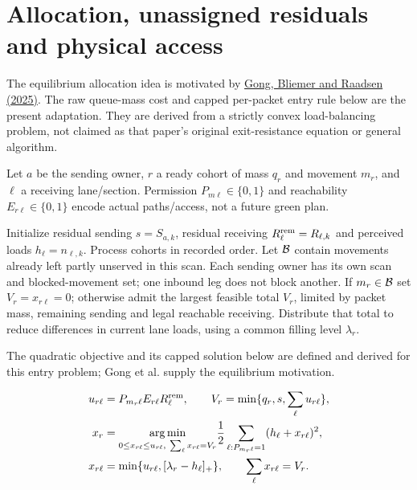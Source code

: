 \documentclass[10pt,a4paper]{article}
\newcommand{\pos}[1]{[#1]_+}
\newcommand{\rev}[1]{{\color{revisionred}#1}}
\begin{document}
\section{Allocation, unassigned residuals and physical access}


The equilibrium allocation idea is motivated by
\href{https://doi.org/10.1016/j.trb.2025.103208}{Gong, Bliemer and Raadsen (2025)}.
The raw queue-mass cost and capped per-packet entry rule below are the
present adaptation. They are derived from a strictly convex load-balancing
problem, not claimed as that paper's original exit-resistance equation
or general algorithm.
\par

Let $a$ be the sending owner, $r$ a ready cohort of mass $q_r$ and
movement $m_r$, and $\ell$ a receiving lane/section.
Permission $P_{m\ell}\in\{0,1\}$ and reachability
$E_{r\ell}\in\{0,1\}$ encode actual paths/access, not a future green plan.

Initialize residual sending $s=S_{a,k}$, residual receiving
$R^{\rm rem}_\ell=R_{\ell,k}$ and perceived loads $h_\ell=n_{\ell,k}$.
Process cohorts in recorded order. Let ${\cal B}$ contain movements
already left partly unserved in this scan. Each sending owner has its own
scan and blocked-movement set; one inbound leg does not block another.
If $m_r\in{\cal B}$ set $V_r=x_{r\ell}=0$; otherwise admit the largest
feasible total $V_r$, limited by packet mass, remaining sending and
legal reachable receiving. Distribute that total to reduce differences
in current lane loads, using a common filling level $\lambda_r$.
\par\begin{samepage}
\rev{The quadratic objective and its capped solution below are defined and derived for this entry problem; Gong et al. supply the equilibrium motivation.}

\begin{align}
 u_{r\ell}&=P_{m_r\ell}E_{r\ell}R^{\rm rem}_\ell,\qquad
 V_r=\min\{q_r,s,\sum_\ell u_{r\ell}\},\nonumber\\
 x_r&=\underset{0\leq x_{r\ell}\leq u_{r\ell},\
                    \sum_\ell x_{r\ell}=V_r}{\arg\min}
          \frac12\sum_{\ell:P_{m_r\ell}=1}(h_\ell+x_{r\ell})^2,
 \nonumber\\
 x_{r\ell}&=\min\{u_{r\ell},\pos{\lambda_r-h_\ell}\},\qquad
                    \sum_\ell x_{r\ell}=V_r .
 \label{eq:allocation}
\end{align}
\par\end{samepage}
\end{document}
